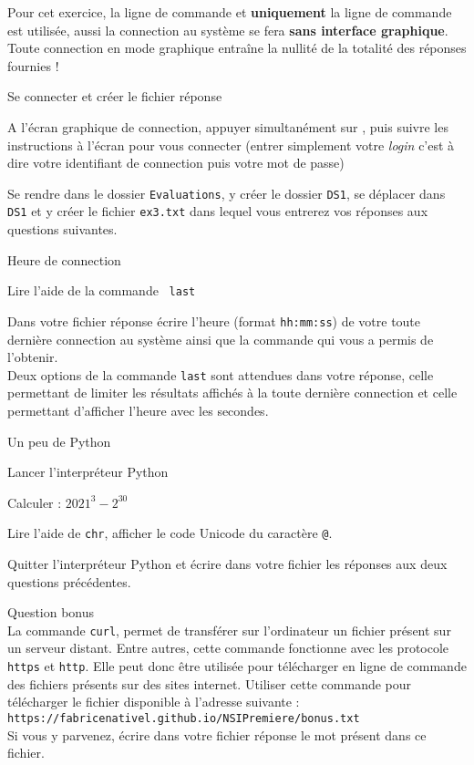 \documentclass[11pt,a4paper]{article}
\begin{document}
\begin{tcolorbox}[title=\textcolor{black}{\danger \; Attention !},colbacktitle=lightgray]
     Pour cet exercice, la ligne de commande et \textbf{uniquement} la ligne de commande est utilisée, aussi la connection au système se fera \textbf{sans interface graphique}. Toute connection en mode graphique entraîne la nullité de la totalité des réponses fournies !
\end{tcolorbox}
\QListe
    \item Se connecter et créer le fichier réponse
\SQListe
\item A l'écran graphique de connection, appuyer simultanément sur , puis suivre les instructions à l'écran pour vous connecter (entrer simplement votre \textit{login} c'est à dire votre identifiant de connection puis votre mot de passe)
\item Se rendre dans le dossier {\tt Evaluations}, y créer le dossier {\tt DS1}, se déplacer dans {\tt DS1} et y créer le fichier {\tt ex3.txt} dans lequel vous entrerez vos réponses aux questions suivantes.
\FinListe
    \item Heure de connection
\SQListe
\item Lire l'aide de la commande  {\tt last}
\item Dans votre fichier réponse écrire l'heure (format {\tt hh:mm:ss}) de votre toute dernière connection au système ainsi que la commande qui vous a permis de l'obtenir.\\
    \aide \; Deux options de la commande {\tt last} sont attendues dans votre réponse, celle permettant de limiter les résultats affichés à la toute dernière connection et celle permettant d'afficher l'heure avec les secondes.
\FinListe
    \item Un peu de Python
\SQListe
    \item Lancer l'interpréteur Python
    \item Calculer : $ 2021^{3}-2^{30}$
    \item Lire l'aide de {\tt chr}, afficher le code Unicode du caractère {\tt @}.
    \item Quitter l'interpréteur Python et écrire dans votre fichier les réponses aux deux questions précédentes.
\FinListe
\item Question bonus \\
La commande {\tt curl}, permet de transférer sur l'ordinateur un fichier présent sur un serveur distant. Entre autres, cette commande fonctionne avec les protocole {\tt https} et {\tt http}. Elle peut donc être utilisée pour télécharger en ligne de commande des fichiers présents sur des sites internet.
Utiliser cette commande pour télécharger le fichier disponible à l'adresse suivante : \\
{\tt https://fabricenativel.github.io/NSIPremiere/bonus.txt}\\
Si vous y parvenez, écrire dans votre fichier réponse le mot présent dans ce fichier.
\end{document}
